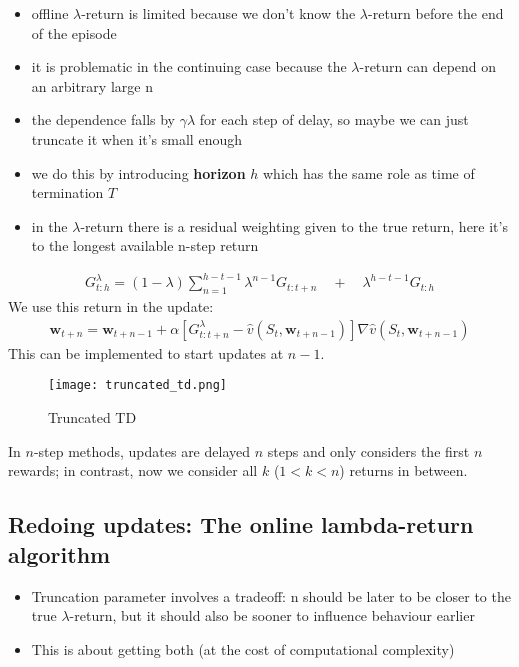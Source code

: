 \documentclass[sutton_barto_notes.tex]{subfiles}
\begin{document}
\begin{itemize}
\item offline $\lambda$-return is limited because we don’t know the $\lambda$-return before the end of the episode 
\item it is problematic in the continuing case because the $\lambda$-return can depend on an arbitrary large n 
\item the dependence falls by $\gamma \lambda$ for each step of delay, so maybe we can just truncate it when it’s small enough 
\item we do this by introducing \textbf{horizon} $h$ which has the same role as time of termination $T$ 
\item in the $\lambda$-return there is a residual weighting given to the true return, here it’s to the longest available n-step return 
\end{itemize}
\begin{align}G_{t:h}^{\lambda} = (1 - \lambda) \sum_{n=1}^{h-t-1} \lambda^{n-1} G_{t:t+n} \quad + \quad \lambda^{h-t-1}G_{t:h} \label{eq:12.7}\tag{12.7}\end{align}
 We use this return in the update: 
\begin{align}\mathbf{w}_{t+n} = \mathbf{w}_{t+n-1} + \alpha [G_{t:t+n}^{\lambda} - \hat{v}(S_t, \mathbf{w}_{t+n-1})] \nabla \hat{v}(S_t, \mathbf{w}_{t+n-1}) \label{eq:12.8}\tag{12.8}\end{align}
 This can be implemented to start updates at $n-1$.
\begin{figure}[h!]
    \centering
     \texttt{[image: truncated\_td.png]}
    \caption{Truncated TD}
\end{figure}
In $n$-step methods, updates are delayed $n$ steps and only considers the first $n$ rewards; in contrast, now we consider all $k$ ($1 < k < n$) returns in between.

\newpage
\subsection{Redoing updates: The online lambda-return algorithm}

\begin{itemize}
\item Truncation parameter involves a tradeoff: n should be later to be closer to the true $\lambda$-return, but it should also be sooner to influence behaviour earlier 
\item This is about getting both (at the cost of computational complexity) 
\end{itemize}
\end{document}
